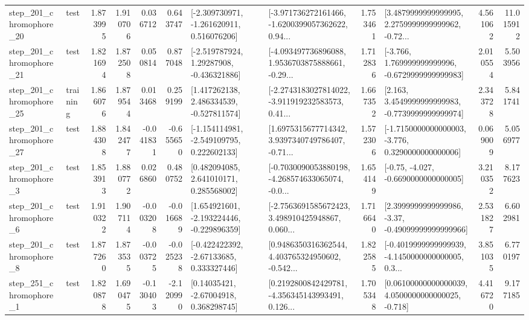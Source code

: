 \begin{tabular}{llrrrrllrlrr}
  step\_201\_chromophore\_20 &      test &      1.873995 &    1.910706 &      0.036712 &  0.643747 &   [-2.309730971, -1.261620911, 0.516076206] &  [-3.971736272161466, -1.6200399057362622, 0.94... &       1.753461 &  [3.4879999999999995, 2.2759999999999962, -0.72... &            4.561062 &         11.015912 \\
  step\_201\_chromophore\_21 &      test &      1.821694 &    1.872508 &      0.050814 &  0.877048 &    [-2.519787924, 1.29287908, -0.436321886] &  [-4.093497736896088, 1.9536703875888661, -0.29... &       1.712836 &   [-3.766, 1.769999999999996, -0.6729999999999983] &            2.010554 &          5.503956 \\
  step\_201\_chromophore\_25 &  training &      1.866076 &    1.879544 &      0.013468 &  0.259199 &    [1.417262138, 2.486334539, -0.527811574] &  [-2.2743183027814022, -3.911919232583573, 0.41... &       1.667352 &   [2.163, 3.4549999999999983, -0.7739999999999974] &            2.343728 &          5.841741 \\
  step\_201\_chromophore\_27 &      test &      1.884308 &    1.842477 &     -0.041831 & -0.655650 &   [-1.154114981, -2.549109795, 0.222602133] &  [1.6975315677714342, 3.9397340749786407, -0.71... &       1.572306 &  [-1.7150000000000003, -3.776, 0.3290000000000006] &            0.069009 &          5.056977 \\
   step\_201\_chromophore\_3 &      test &      1.853913 &    1.880772 &      0.026860 &  0.480752 &     [0.482094085, 2.641010171, 0.285568002] &  [-0.7030090053880198, -4.268574633065074, -0.0... &       1.654149 &               [-0.75, -4.027, -0.6690000000000005] &            3.210352 &          8.177623 \\
   step\_201\_chromophore\_6 &      test &      1.910322 &    1.907114 &     -0.003208 & -0.016689 &   [1.654921601, -2.193224446, -0.229896359] &  [-2.7563691585672423, 3.498910425948867, 0.060... &       1.716640 &  [2.3999999999999986, -3.37, -0.49099999999999966] &            2.531827 &          6.602981 \\
   step\_201\_chromophore\_8 &      test &      1.877260 &    1.873535 &     -0.003725 & -0.025238 &    [-0.422422392, -2.67133685, 0.333327446] &  [0.9486350316362544, 4.403765324950602, -0.542... &       1.822585 &  [-0.4019999999999939, -4.1450000000000005, 0.3... &            3.851035 &          6.770197 \\
   step\_251\_chromophore\_1 &      test &      1.820878 &    1.690475 &     -0.130403 & -2.120990 &      [0.14035421, -2.67004918, 0.368298745] &  [0.2192800842429781, -4.356345143993491, 0.126... &       1.705348 &  [0.06100000000000039, 4.0500000000000025, -0.718] &            4.416720 &          9.177185 \\

\end{tabular}
